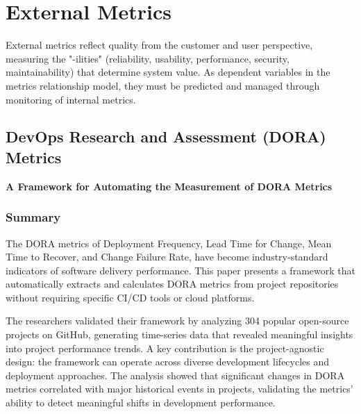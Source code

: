 \documentclass[12pt]{article}
\begin{document}
\section{External Metrics}

External metrics reflect quality from the customer and user
perspective, measuring the "-ilities" (reliability, usability,
performance, security, maintainability) that determine system value.
As dependent variables in the metrics relationship model, they must be
predicted and managed through monitoring of internal
metrics.

\subsection{DevOps Research and Assessment (DORA) Metrics}

\textbf{A Framework for Automating the Measurement of DORA Metrics} \cite{wilkes2023framework}

\subsubsection{Summary}
The DORA metrics of Deployment Frequency, Lead Time
for Change, Mean Time to Recover, and Change Failure Rate, have
become industry-standard indicators of software delivery performance.
This paper presents a framework
that automatically extracts and calculates DORA metrics from project
repositories without requiring specific CI/CD tools or cloud
platforms.

The researchers validated their framework by analyzing 304
popular open-source projects on GitHub, generating time-series data
that revealed meaningful insights into project performance trends. A
key contribution is the project-agnostic design: the framework can
operate across diverse development lifecycles and deployment
approaches. The analysis showed that significant changes in DORA
metrics correlated with major historical events in projects,
validating the metrics' ability to detect meaningful shifts in
development performance.
\end{document}
